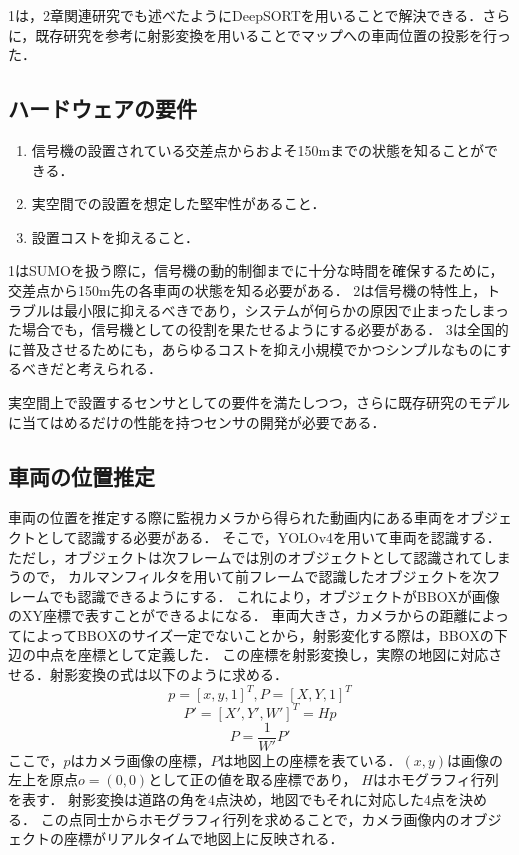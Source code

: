 1は，2章関連研究でも述べたようにDeepSORTを用いることで解決できる．さらに，既存研究を参考に射影変換を用いることでマップへの車両位置の投影を行った．

\subsection{ハードウェアの要件}
\begin{enumerate}
	\item 信号機の設置されている交差点からおよそ150mまでの状態を知ることができる．%
	\item 実空間での設置を想定した堅牢性があること．
	\item 設置コストを抑えること．
\end{enumerate}
1はSUMOを扱う際に，信号機の動的制御までに十分な時間を確保するために，交差点から150m先の各車両の状態を知る必要がある．
2は信号機の特性上，トラブルは最小限に抑えるべきであり，システムが何らかの原因で止まったしまった場合でも，信号機としての役割を果たせるようにする必要がある．
3は全国的に普及させるためにも，あらゆるコストを抑え小規模でかつシンプルなものにするべきだと考えられる．


実空間上で設置するセンサとしての要件を満たしつつ，さらに既存研究のモデルに当てはめるだけの性能を持つセンサの開発が必要である．

\subsection{車両の位置推定}
車両の位置を推定する際に監視カメラから得られた動画内にある車両をオブジェクトとして認識する必要がある．
そこで，YOLOv4\cite{bochkovskiy2020yolov4}を用いて車両を認識する．
ただし，オブジェクトは次フレームでは別のオブジェクトとして認識されてしまうので，
カルマンフィルタを用いて前フレームで認識したオブジェクトを次フレームでも認識できるようにする．
これにより，オブジェクトがBBOXが画像のXY座標で表すことができるよになる．
車両大きさ，カメラからの距離によってによってBBOXのサイズ一定でないことから，射影変化する際は，BBOXの下辺の中点を座標として定義した．
この座標を射影変換し，実際の地図に対応させる．射影変換の式は以下のように求める．
\begin{equation}
    p = [x, y, 1]^T, P = [X, Y, 1]^T
  \end{equation}
  \begin{equation}
    P' = [X', Y', W']^T = Hp
  \end{equation}
  \begin{equation}
    P = \frac{1}{W'}P'
\end{equation}
ここで，$p$はカメラ画像の座標，$P$は地図上の座標を表ている．$(x,y)$は画像の左上を原点$o = (0, 0)$として正の値を取る座標であり，
$H$はホモグラフィ行列を表す．
射影変換は道路の角を4点決め，地図でもそれに対応した4点を決める．
この点同士からホモグラフィ行列を求めることで，カメラ画像内のオブジェクトの座標がリアルタイムで地図上に反映される．

